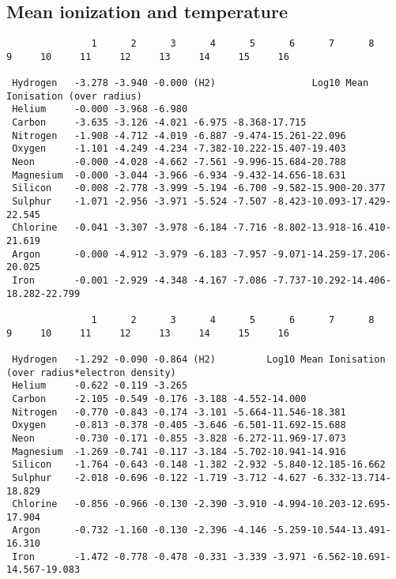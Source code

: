 \subsection{Mean ionization and temperature}
{\setverbatimfontsize{\tiny}
\begin{verbatim}
               1      2      3      4      5      6      7      8      9     10     11     12     13     14     15     16

 Hydrogen   -3.278 -3.940 -0.000 (H2)                 Log10 Mean Ionisation (over radius)
 Helium     -0.000 -3.968 -6.980
 Carbon     -3.635 -3.126 -4.021 -6.975 -8.368-17.715
 Nitrogen   -1.908 -4.712 -4.019 -6.887 -9.474-15.261-22.096
 Oxygen     -1.101 -4.249 -4.234 -7.382-10.222-15.407-19.403
 Neon       -0.000 -4.028 -4.662 -7.561 -9.996-15.684-20.788
 Magnesium  -0.000 -3.044 -3.966 -6.934 -9.432-14.656-18.631
 Silicon    -0.008 -2.778 -3.999 -5.194 -6.700 -9.582-15.900-20.377
 Sulphur    -1.071 -2.956 -3.971 -5.524 -7.507 -8.423-10.093-17.429-22.545
 Chlorine   -0.041 -3.307 -3.978 -6.184 -7.716 -8.802-13.918-16.410-21.619
 Argon      -0.000 -4.912 -3.979 -6.183 -7.957 -9.071-14.259-17.206-20.025
 Iron       -0.001 -2.929 -4.348 -4.167 -7.086 -7.737-10.292-14.406-18.282-22.799

               1      2      3      4      5      6      7      8      9     10     11     12     13     14     15     16

 Hydrogen   -1.292 -0.090 -0.864 (H2)         Log10 Mean Ionisation (over radius*electron density)
 Helium     -0.622 -0.119 -3.265
 Carbon     -2.105 -0.549 -0.176 -3.188 -4.552-14.000
 Nitrogen   -0.770 -0.843 -0.174 -3.101 -5.664-11.546-18.381
 Oxygen     -0.813 -0.378 -0.405 -3.646 -6.501-11.692-15.688
 Neon       -0.730 -0.171 -0.855 -3.828 -6.272-11.969-17.073
 Magnesium  -1.269 -0.741 -0.117 -3.184 -5.702-10.941-14.916
 Silicon    -1.764 -0.643 -0.148 -1.382 -2.932 -5.840-12.185-16.662
 Sulphur    -2.018 -0.696 -0.122 -1.719 -3.712 -4.627 -6.332-13.714-18.829
 Chlorine   -0.856 -0.966 -0.130 -2.390 -3.910 -4.994-10.203-12.695-17.904
 Argon      -0.732 -1.160 -0.130 -2.396 -4.146 -5.259-10.544-13.491-16.310
 Iron       -1.472 -0.778 -0.478 -0.331 -3.339 -3.971 -6.562-10.691-14.567-19.083
\end{verbatim}
}

